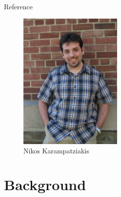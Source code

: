 \documentclass{beamer}
\begin{document}
\begin{frame}{Reference}
\begin{figure}
\begin{minipage}[t]{.2\paperwidth}
        \includegraphics[width=\textwidth]{res/Nikos Karampatziakis.jpg}
        \caption{Nikos Karampatziakis}
    \end{minipage}
\end{figure}

\end{frame}

\section{Background}
\end{document}

